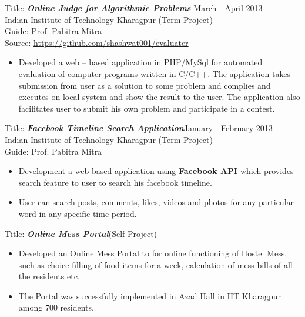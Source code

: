 \documentclass[hidelinks,margin,line,10pt,a4paper]{resume}
\begin{document}
\begin{resume}
Title: \textbf{\emph{Online Judge for Algorithmic Problems}} \hfill March - April 2013 \\
Indian Institute of Technology Kharagpur \hfill (Term Project) \\
Guide: Prof. Pabitra Mitra \\
Source: \href{https://github.com/shashwat001/evaluater}{https://github.com/shashwat001/evaluater}
\vspace{2mm}%
\begin{itemize}
\item Developed a web – based application in PHP/MySql for automated evaluation of computer programs written in C/C++. The application takes submission from user as a solution to some problem and complies and executes on local system and show the result to the user. The application also facilitates user to submit his own problem and participate in a contest.   
\end{itemize}

Title: \textbf{\emph{Facebook Timeline Search Application}}\hfill January - February 2013 \\
Indian Institute of Technology Kharagpur \hfill  (Term Project) \\
Guide: Prof. Pabitra Mitra
\vspace{2mm}%
\begin{itemize}
\item Development a web based application using \textbf{Facebook API} which provides search feature to user to search his facebook timeline. 
\item User can search posts, comments, likes, videos and photos for any particular word in any specific time period.
\end{itemize}

Title: \textbf{\emph{Online Mess Portal}}\hfill (Self Project) 
\vspace{2mm}%
\begin{itemize}
\item Developed an Online Mess Portal to for online functioning of Hostel Mess, such as choice filling of food items for a week, calculation of mess bills of all the residents etc.
\item The Portal was successfully implemented in Azad Hall in IIT Kharagpur among 700 residents.
\end{itemize}

\pagebreak


\end{resume}
\end{document}
